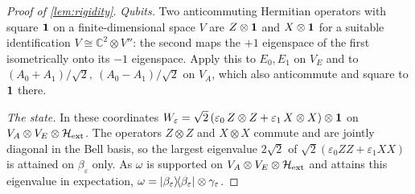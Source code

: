 \begin{proof}[Proof of \cref{lem:rigidity}]
\emph{Qubits.} Two anticommuting Hermitian operators with square $\mathbf{1}$ on a finite-dimensional space $V$ are
$Z\otimes\mathbf{1}$ and $X\otimes\mathbf{1}$ for a suitable identification $V\cong\mathbb{C}^2\otimes V''$: the second maps the
$+1$ eigenspace of the first isometrically onto its $-1$ eigenspace. Apply this to $E_0,E_1$ on $V_E$ and to
$(A_0+A_1)/\sqrt2,\ (A_0-A_1)/\sqrt2$ on $V_A$, which also anticommute and square to $\mathbf{1}$ there.

\emph{The state.} In these coordinates $W_\varepsilon=\sqrt2\,(\varepsilon_0\,Z\otimes Z+\varepsilon_1\,X\otimes X)\otimes\mathbf{1}$
on $V_A\otimes V_E\otimes\mathcal{H}_{\mathrm{ext}}$. The operators $Z\otimes Z$ and $X\otimes X$ commute and are jointly
diagonal in the Bell basis, so the largest eigenvalue $2\sqrt2$ of $\sqrt2(\varepsilon_0ZZ+\varepsilon_1XX)$ is
attained on $\beta_\varepsilon$ only. As $\omega$ is supported on $V_A\otimes V_E\otimes\mathcal{H}_{\mathrm{ext}}$ and
attains this eigenvalue in expectation, $\omega=\lvert \beta_\varepsilon\rangle\!\langle \beta_\varepsilon\rvert\otimes\gamma_\varepsilon$.
\end{proof}
